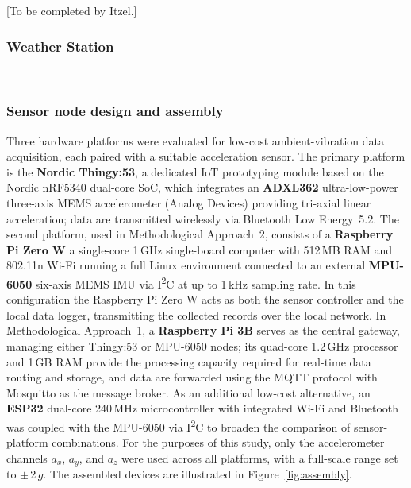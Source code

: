\documentclass{eurodyn2026}
\begin{document}
[To be completed by Itzel.] \\


\subsubsection*{Weather Station}

 \\


\subsubsection*{Sensor node design and assembly}

\noindent Three hardware platforms were evaluated for low-cost ambient-vibration data
acquisition, each paired with a suitable acceleration sensor. The primary
platform is the \textbf{Nordic Thingy:53}, a dedicated IoT prototyping module
based on the Nordic nRF5340 dual-core SoC, which integrates an \textbf{ADXL362}
ultra-low-power three-axis MEMS accelerometer (Analog Devices) providing
tri-axial linear acceleration; data are transmitted wirelessly via Bluetooth
Low Energy~5.2. The second platform, used in Methodological Approach~2,
consists of a \textbf{Raspberry Pi Zero W} a single-core 1\,GHz
single-board computer with 512\,MB RAM and 802.11n Wi-Fi running a full
Linux environment connected to an external \textbf{MPU-6050} six-axis
MEMS IMU via I\textsuperscript{2}C at up to 1\,kHz sampling rate. In this configuration 
the Raspberry Pi Zero W acts as both the sensor controller and the local data logger, transmitting the collected 
records over the local network. In Methodological Approach~1, a \textbf{Raspberry Pi 3B} serves as
the central gateway, managing either Thingy:53 or MPU-6050 nodes; its
quad-core 1.2\,GHz processor and 1\,GB RAM provide the processing capacity
required for real-time data routing and storage, and data are forwarded using
the MQTT protocol with Mosquitto as the message broker. As an additional
low-cost alternative, an \textbf{ESP32} dual-core 240\,MHz microcontroller
with integrated Wi-Fi and Bluetooth was coupled with the MPU-6050 via
I\textsuperscript{2}C to broaden the comparison of sensor-platform
combinations. For the purposes of this study, only the accelerometer channels
$a_x$, $a_y$, and $a_z$ were used across all platforms, with a full-scale
range set to $\pm$\,2\,$g$. The assembled devices are illustrated in Figure~\ref{fig:assembly}.
\end{document}
